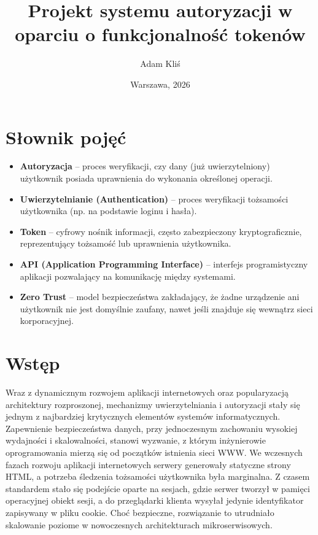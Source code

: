 \documentclass{SGGW-thesis}
\author{Adam Kliś}
\title{Projekt systemu autoryzacji w oparciu o funkcjonalność tokenów}
\date{Warszawa, 2026}
\begin{document}
\maketitle

\section*{Słownik pojęć}
\begin{itemize}
    \item \textbf{Autoryzacja} – proces weryfikacji, czy dany (już uwierzytelniony) użytkownik posiada uprawnienia do wykonania określonej operacji.
    \item \textbf{Uwierzytelnianie (Authentication)} – proces weryfikacji tożsamości użytkownika (np. na podstawie loginu i hasła).
    \item \textbf{Token} – cyfrowy nośnik informacji, często zabezpieczony kryptograficznie, reprezentujący tożsamość lub uprawnienia użytkownika.
    \item \textbf{API (Application Programming Interface)} – interfejs programistyczny aplikacji pozwalający na komunikację między systemami.
    \item \textbf{Zero Trust} – model bezpieczeństwa zakładający, że żadne urządzenie ani użytkownik nie jest domyślnie zaufany, nawet jeśli znajduje się wewnątrz sieci korporacyjnej.
\end{itemize}

\clearpage
\tableofcontents
\clearpage

\section{Wstęp}

Wraz z dynamicznym rozwojem aplikacji internetowych oraz popularyzacją architektury rozproszonej, mechanizmy uwierzytelniania i autoryzacji stały się jednym z najbardziej krytycznych elementów systemów informatycznych. Zapewnienie bezpieczeństwa danych, przy jednoczesnym zachowaniu wysokiej wydajności i skalowalności, stanowi wyzwanie, z którym inżynierowie oprogramowania mierzą się od początków istnienia sieci WWW. We wczesnych fazach rozwoju aplikacji internetowych serwery generowały statyczne strony HTML, a potrzeba śledzenia tożsamości użytkownika była marginalna. Z czasem standardem stało się podejście oparte na sesjach, gdzie serwer tworzył w pamięci operacyjnej obiekt sesji, a do przeglądarki klienta wysyłał jedynie identyfikator zapisywany w pliku cookie. Choć bezpieczne, rozwiązanie to utrudniało skalowanie poziome w nowoczesnych architekturach mikroserwisowych.
\end{document}
